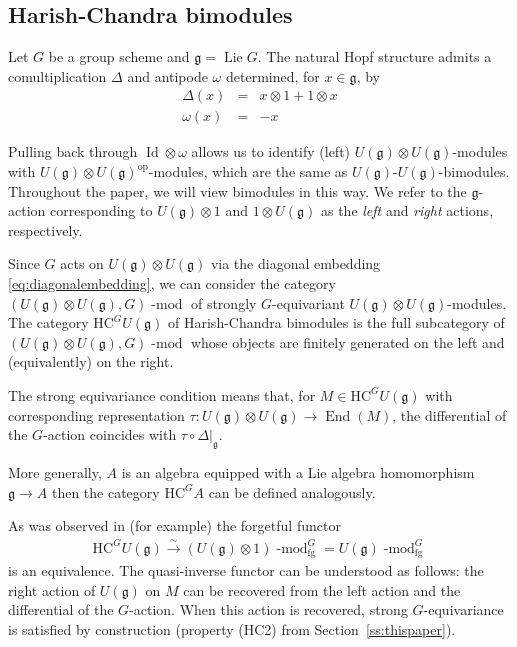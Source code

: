 \documentclass[twoside,12pt,reqno]{amsart}
\theoremstyle{remark}
\numberwithin{equation}{section}
\def\isoto{\overset{\sim}{\longrightarrow}}
\def\lmod{\!\operatorname{-mod}}
\def\Lie{\operatorname{Lie}}
\def\Id{\operatorname{Id}}
\def\End{\operatorname{End}}
\def\op{{\operatorname{op}}}
\def\HC{\mathrm{HC}}
\def\g{{\mathfrak g}}
\newcommand{\fg}{\operatorname{fg}}
\begin{document}
\subsection{Harish-Chandra bimodules}
\label{ss:HCbimods}

Let $G$ be a group scheme and $\g = \Lie G$. The natural Hopf structure admits a comultiplication $\Delta$ and antipode $\omega$ determined, for $x\in \g$, by
\begin{eqnarray*}
    \Delta(x) & = & x\otimes 1 + 1\otimes x\\
    \omega(x) & = & -x
\end{eqnarray*}
 
Pulling back through $\Id\otimes \omega$ allows us to identify (left) $U(\g) \otimes U(\g)$-modules with $U(\g) \otimes U(\g)^\op$-modules, which are the same as $U(\g)$-$U(\g)$-bimodules. Throughout the paper, we will view bimodules in this way. We refer to the $\g$-action corresponding to $U(\g) \otimes 1$ and $1\otimes U(\g)$ as the {\it left} and {\it right} actions, respectively. 

Since $G$ acts on $U(\g)\otimes U(\g)$ via the diagonal embedding \eqref{eq:diagonalembedding}, we can consider the category $(U(\g) \otimes U(\g), G)\lmod$ of strongly $G$-equivariant $U(\g) \otimes U(\g)$-modules. The category $\HC^G U(\g)$ of Harish-Chandra bimodules is the full subcategory of $(U(\g) \otimes U(\g), G)\lmod$ whose objects are finitely generated on the left and (equivalently) on the right.

The strong equivariance condition means that, for $M \in \HC^G U(\g)$ with corresponding representation $\tau : U(\g) \otimes U(\g) \to \End(M)$, the differential of the $G$-action coincides with $\tau \circ \Delta|_{\g}$. 

More generally, $A$ is an algebra equipped with a Lie algebra homomorphism $\g \to A$ then the category $\HC^G A$ can be defined analogously.

As was observed in \cite[(3.5)]{BR} (for example) the forgetful functor 
    \begin{eqnarray}
        \label{L:HCequivalencewithequivariance}
    \HC^G U(\g) \isoto (U(\g)\otimes 1)\lmod^G_{\fg} = U(\g)\lmod^G_{\fg}
    \end{eqnarray}
   is an equivalence. The quasi-inverse functor can be understood as follows: the right action of $U(\g)$ on $M$ can be recovered from the left action and the differential of the $G$-action. When this action is recovered, strong $G$-equivariance is satisfied by construction (property (HC2) from Section~\ref{ss:thispaper}).
\end{document}
